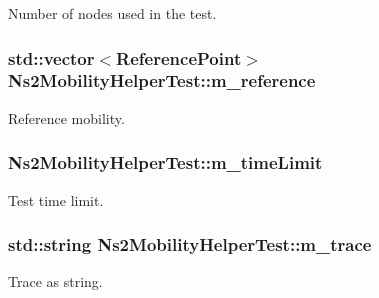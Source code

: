 Number of nodes used in the test. 

\subsubsection[{\texorpdfstring{m\+\_\+reference}{m_reference}}]{\setlength{\rightskip}{0pt plus 5cm}std\+::vector$<${\bf Reference\+Point}$>$ Ns2\+Mobility\+Helper\+Test\+::m\+\_\+reference\hspace{0.3cm}{\ttfamily [private]}}\hypertarget{classNs2MobilityHelperTest_a65ba0d596846b8035a7d75c26192d43e}{}\label{classNs2MobilityHelperTest_a65ba0d596846b8035a7d75c26192d43e}


Reference mobility. 

\subsubsection[{\texorpdfstring{m\+\_\+time\+Limit}{m_timeLimit}}]{ Ns2\+Mobility\+Helper\+Test\+::m\+\_\+time\+Limit\hspace{0.3cm}{\ttfamily [private]}}\hypertarget{classNs2MobilityHelperTest_a634f61620a7cc01812c51169878f1704}{}\label{classNs2MobilityHelperTest_a634f61620a7cc01812c51169878f1704}


Test time limit. 

\subsubsection[{\texorpdfstring{m\+\_\+trace}{m_trace}}]{\setlength{\rightskip}{0pt plus 5cm}std\+::string Ns2\+Mobility\+Helper\+Test\+::m\+\_\+trace\hspace{0.3cm}{\ttfamily [private]}}\hypertarget{classNs2MobilityHelperTest_a50e34459c6cde5f834f874284687f71a}{}\label{classNs2MobilityHelperTest_a50e34459c6cde5f834f874284687f71a}


Trace as string. 

